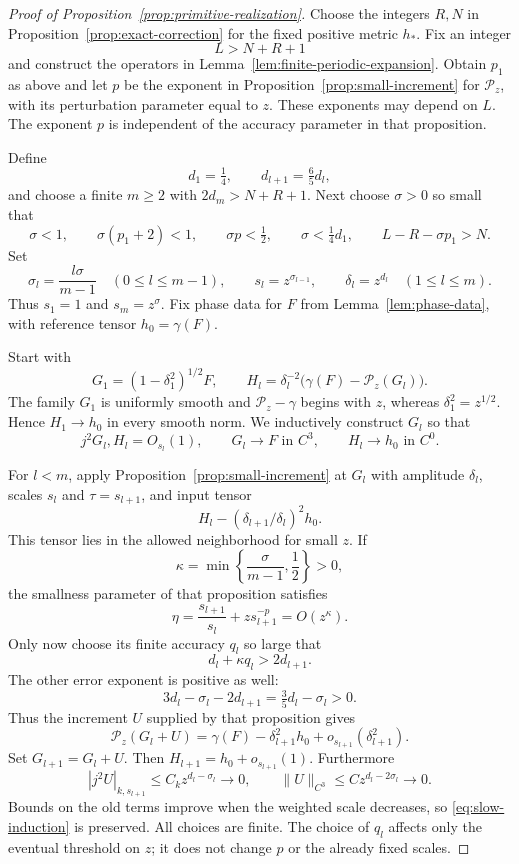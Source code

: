 \begin{proof}[Proof of Proposition~\ref{prop:primitive-realization}]
Choose the integers $R,N$ in Proposition~\ref{prop:exact-correction} for
the fixed positive metric $h_*$.  Fix an integer
\[
 L>N+R+1
\]
and construct the operators in Lemma~\ref{lem:finite-periodic-expansion}.
Obtain $p_1$ as above and let $p$ be the exponent in
Proposition~\ref{prop:small-increment} for $\mathcal P_z$, with its
perturbation parameter equal to $z$.  These exponents may depend on $L$.
The exponent $p$ is independent of the accuracy parameter in that
proposition.

Define
\[
 d_1=\tfrac14,\qquad d_{l+1}=\tfrac65d_l,
\]
and choose a finite $m\ge2$ with $2d_m>N+R+1$.  Next choose
$\sigma>0$ so small that
\begin{equation}
 \sigma<1,\qquad \sigma(p_1+2)<1,\qquad
 \sigma p<\tfrac12,\qquad \sigma<\tfrac14d_1,
 \qquad L-R-\sigma p_1>N.
 \label{eq:slow-scale-choice}
\end{equation}
Set
\[
 \sigma_l=\frac{l\sigma}{m-1}\quad(0\le l\le m-1),\qquad
 s_l=z^{\sigma_{l-1}},\qquad \delta_l=z^{d_l}
       \quad(1\le l\le m).
\]
Thus $s_1=1$ and $s_m=z^\sigma$.  Fix phase data for $F$ from
Lemma~\ref{lem:phase-data}, with reference tensor $h_0=\gamma(F)$.

Start with
\[
 G_1=(1-\delta_1^2)^{1/2}F,
 \qquad
 H_l=\delta_l^{-2}\bigl(\gamma(F)-\mathcal P_z(G_l)\bigr).
\]
The family $G_1$ is uniformly smooth and $\mathcal P_z-\gamma$ begins
with $z$, whereas $\delta_1^2=z^{1/2}$.  Hence $H_1\to h_0$ in every
smooth norm.  We inductively construct $G_l$ so that
\begin{equation}
 j^2G_l,H_l=O_{s_l}(1),\qquad
 G_l\to F\text{ in }C^3,\qquad H_l\to h_0\text{ in }C^0.
 \label{eq:slow-induction}
\end{equation}

For $l<m$, apply Proposition~\ref{prop:small-increment} at $G_l$ with
amplitude $\delta_l$, scales $s_l$ and $\tau=s_{l+1}$, and input tensor
\[
 H_l-(\delta_{l+1}/\delta_l)^2h_0.
\]
This tensor lies in the allowed neighborhood for small $z$.  If
\[
 \kappa=\min\left\{\frac{\sigma}{m-1},\frac12\right\}>0,
\]
the smallness parameter of that proposition satisfies
\[
 \eta=\frac{s_{l+1}}{s_l}+zs_{l+1}^{-p}=O(z^\kappa).
\]
Only now choose its finite accuracy $q_l$ so large that
\[
 d_l+\kappa q_l>2d_{l+1}.
\]
The other error exponent is positive as well:
\[
 3d_l-\sigma_l-2d_{l+1}
      =\tfrac35d_l-\sigma_l>0.
\]
Thus the increment $U$ supplied by that proposition gives
\[
 \mathcal P_z(G_l+U)
      =\gamma(F)-\delta_{l+1}^2h_0
                       +o_{s_{l+1}}(\delta_{l+1}^2).
\]
Set $G_{l+1}=G_l+U$.  Then $H_{l+1}=h_0+o_{s_{l+1}}(1)$.
Furthermore
\[
 |j^2U|_{k,s_{l+1}}\le C_k z^{d_l-\sigma_l}\longrightarrow0,
 \qquad
 \|U\|_{C^3}\le C z^{d_l-2\sigma_l}\longrightarrow0.
\]
Bounds on the old terms improve when the weighted scale decreases, so
\eqref{eq:slow-induction} is preserved.  All choices are finite.  The
choice of $q_l$ affects only the eventual threshold on $z$; it does not
change $p$ or the already fixed scales.


\end{proof}
